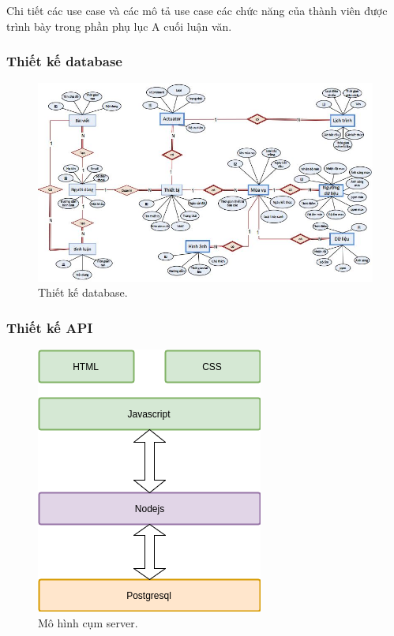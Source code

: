 \documentclass[a4paper,12pt,oneside]{article}
\begin{document}
\noindent Chi tiết các use case và các mô tả use case các chức năng của thành viên được trình bày trong phần phụ lục A cuối luận văn.

\subsubsection{Thiết kế database}

\begin{landscape}
\begin{figure}[b]
	\includegraphics[scale=1.1]{hinh/database.jpg}
	\caption{Thiết kế database.}
	\label{xyz}
\end{figure}
\end{landscape}

\subsubsection{Thiết kế API}

\begin{figure}[H]
	\centering
	\includegraphics[scale=.9]{hinh/server.png}
	\caption{Mô hình cụm server.}
\end{figure}
\end{document}
